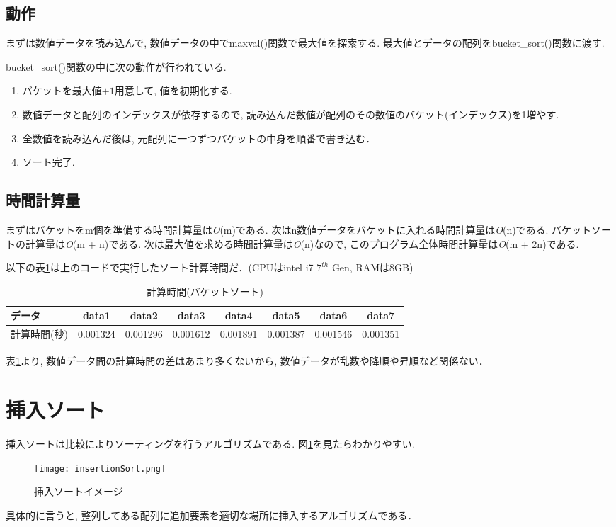 \documentclass[a4j, titlepage]{jarticle}
\begin{document}
\subsection{動作}
まずは数値データを読み込んで, 数値データの中でmaxval()関数で最大値を探索する. 最大値とデータの配列をbucket\_sort()関数に渡す.

bucket\_sort()関数の中に次の動作が行われている.
\begin{enumerate}
\item バケットを最大値$+1$用意して, 値を初期化する. 
\item 数値データと配列のインデックスが依存するので, 読み込んだ数値が配列のその数値のバケット(インデックス)を1増やす. 
\item 全数値を読み込んだ後は, 元配列に一つずつバケットの中身を順番で書き込む．
\item ソート完了.
\end{enumerate}

\subsection{時間計算量}
まずはバケットをm個を準備する時間計算量は\textit{O}(m)である. 次はn数値データをバケットに入れる時間計算量は\textit{O}(n)である. バケットソートの計算量は\textit{O}(m + n)である. 次は最大値を求める時間計算量は\textit{O}(n)なので, このプログラム全体時間計算量は\textit{O}(m + 2n)である. 

以下の表\ref{table:bucket}は上のコードで実行したソート計算時間だ．(CPUはintel i7 $7^{th}$ Gen, RAMは8GB)
\begin{table}[bth]
\label{table:bucket}
\caption{計算時間(バケットソート)}
\begin{center}
\begin{tabular}{|l|ccccccc|}
\hline
データ & data1 & data2 &data3 &data4 &data5 &data6 &data7 \\ \hline
計算時間(秒) & 0.001324 & \cellcolor{green!20}0.001296 & 0.001612 & \cellcolor{red!20} 0.001891 & 0.001387 & 0.001546 & 0.001351\\ \hline
\end{tabular}
\end{center}
\end{table}

表\ref{table:bucket}より, 数値データ間の計算時間の差はあまり多くないから, 数値データが乱数や降順や昇順など関係ない．  


\section{挿入ソート}
挿入ソートは比較によりソーティングを行うアルゴリズムである. 図\ref{insert}を見たらわかりやすい.　
\begin{figure}[tbh]
\centering \texttt{[image: insertionSort.png]}
\caption{挿入ソートイメージ}
\label{insert}
\end{figure}
具体的に言うと, 整列してある配列に追加要素を適切な場所に挿入するアルゴリズムである．
\end{document}
